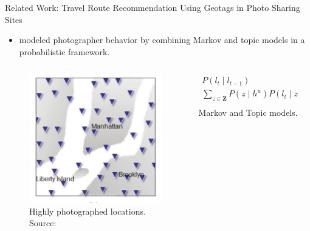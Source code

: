 \documentclass{beamer}
\begin{document}
\begin{frame}{Related Work: Travel Route Recommendation Using Geotags in Photo Sharing Sites}
  \begin{itemize}
    \item \citet{Kurashima2010} modeled photographer behavior by combining Markov and topic models in a probabilistic framework.
  \end{itemize}
  \begin{columns}
    \begin{column}{0.3\textwidth}
      \begin{figure}
        \centering
        \includegraphics[width=\textwidth]{kurashima1}
        \caption{Highly photographed locations. {\tiny Source: \citet{Kurashima2010}}}
      \end{figure}
    \end{column}
    \pause
    \begin{column}{0.3\textwidth}
      \begin{align*}
        P(l_{t} \mid l_{t-1}) \\
        \sum_{z \in \bm{Z}}P(z \mid h^{u})P(l_{t} \mid z) \\
      \end{align*}
      Markov and Topic models.
    \end{column}
    \pause
    \begin{column}{0.3\textwidth}

\end{column}
\end{columns}
\end{frame}
\end{document}
